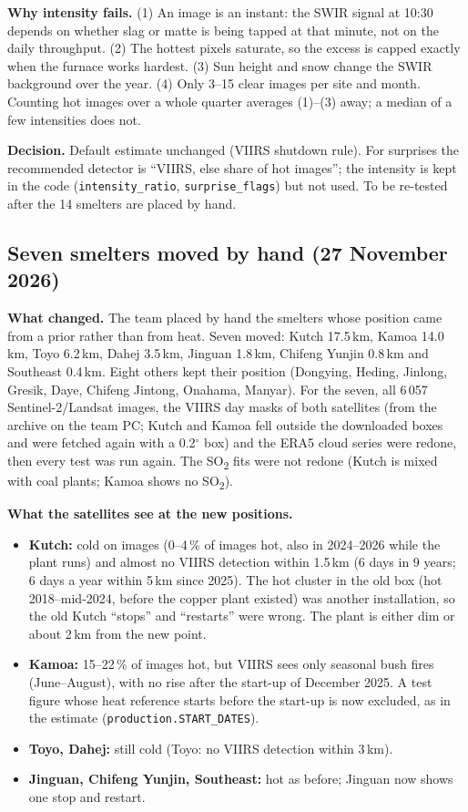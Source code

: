 \documentclass[10pt,a4paper]{article}
\newcommand{\SOtwo}{SO\textsubscript{2}}
\newcommand{\code}[1]{\texttt{\small #1}}
\begin{document}
\textbf{Why intensity fails.} (1) An image is an instant: the SWIR signal at 10:30 depends on whether slag or matte is being tapped at that minute, not on the daily throughput. (2) The hottest pixels saturate, so the excess is capped exactly when the furnace works hardest. (3) Sun height and snow change the SWIR background over the year. (4) Only 3--15 clear images per site and month. Counting hot images over a whole quarter averages (1)--(3) away; a median of a few intensities does not.

\textbf{Decision.} Default estimate unchanged (VIIRS shutdown rule). For surprises the recommended detector is ``VIIRS, else share of hot images''; the intensity is kept in the code (\code{intensity\_ratio}, \code{surprise\_flags}) but not used. To be re-tested after the 14 smelters are placed by hand.

\subsection{Seven smelters moved by hand (27 November 2026)}\label{sec:moved}

\textbf{What changed.} The team placed by hand the smelters whose position came from a prior rather than from heat. Seven moved: Kutch 17.5\,km, Kamoa 14.0\,km, Toyo 6.2\,km, Dahej 3.5\,km, Jinguan 1.8\,km, Chifeng Yunjin 0.8\,km and Southeast 0.4\,km. Eight others kept their position (Dongying, Heding, Jinlong, Gresik, Daye, Chifeng Jintong, Onahama, Manyar). For the seven, all 6\,057 Sentinel-2/Landsat images, the VIIRS day masks of both satellites (from the archive on the team PC; Kutch and Kamoa fell outside the downloaded boxes and were fetched again with a 0.2$^\circ$ box) and the ERA5 cloud series were redone, then every test was run again. The \SOtwo{} fits were not redone (Kutch is mixed with coal plants; Kamoa shows no \SOtwo).

\textbf{What the satellites see at the new positions.}
\begin{itemize}[leftmargin=1.2em]
  \item \textbf{Kutch:} cold on images (0--4\,\% of images hot, also in 2024--2026 while the plant runs) and almost no VIIRS detection within 1.5\,km (6 days in 9 years; 6 days a year within 5\,km since 2025). The hot cluster in the old box (hot 2018--mid-2024, before the copper plant existed) was another installation, so the old Kutch ``stops'' and ``restarts'' were wrong. The plant is either dim or about 2\,km from the new point.
  \item \textbf{Kamoa:} 15--22\,\% of images hot, but VIIRS sees only seasonal bush fires (June--August), with no rise after the start-up of December 2025. A test figure whose heat reference starts before the start-up is now excluded, as in the estimate (\code{production.START\_DATES}).
  \item \textbf{Toyo, Dahej:} still cold (Toyo: no VIIRS detection within 3\,km).
  \item \textbf{Jinguan, Chifeng Yunjin, Southeast:} hot as before; Jinguan now shows one stop and restart.
\end{itemize}
\end{document}
